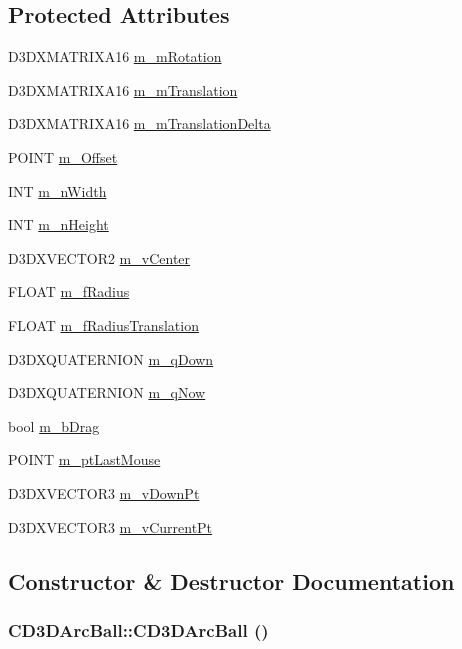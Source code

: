\subsection*{Protected Attributes}
\begin{DoxyCompactItemize}
\item 
D3DXMATRIXA16 \hyperlink{class_c_d3_d_arc_ball_a02619e72fe82db21a3c237a94eb31a37}{m\_\-mRotation}
\item 
D3DXMATRIXA16 \hyperlink{class_c_d3_d_arc_ball_a2d9f13c59ac72cec38ab704159b7e4e9}{m\_\-mTranslation}
\item 
D3DXMATRIXA16 \hyperlink{class_c_d3_d_arc_ball_ad630f2a7fc9ca7f77574ba9e9560c672}{m\_\-mTranslationDelta}
\item 
POINT \hyperlink{class_c_d3_d_arc_ball_ab6246cc5b63d98a3dfcb4530cae75ef4}{m\_\-Offset}
\item 
INT \hyperlink{class_c_d3_d_arc_ball_a71b658e5247eb150029dfe923bd116c3}{m\_\-nWidth}
\item 
INT \hyperlink{class_c_d3_d_arc_ball_a53bb3eeba4a817148421c5c53b4b846d}{m\_\-nHeight}
\item 
D3DXVECTOR2 \hyperlink{class_c_d3_d_arc_ball_a6075b159b5221b3091e32b090c0dcab3}{m\_\-vCenter}
\item 
FLOAT \hyperlink{class_c_d3_d_arc_ball_a11401fa5425ecaab3669745a4c20e552}{m\_\-fRadius}
\item 
FLOAT \hyperlink{class_c_d3_d_arc_ball_a4600c8ffe537118ba7b8f7fdc60c9322}{m\_\-fRadiusTranslation}
\item 
D3DXQUATERNION \hyperlink{class_c_d3_d_arc_ball_a944bbe7cbea8e5c715b1c62a0a6ba32f}{m\_\-qDown}
\item 
D3DXQUATERNION \hyperlink{class_c_d3_d_arc_ball_a248db3d61e41f65195810367bbe849f1}{m\_\-qNow}
\item 
bool \hyperlink{class_c_d3_d_arc_ball_a437b55976f4fe81a6f294a2d1f11ac81}{m\_\-bDrag}
\item 
POINT \hyperlink{class_c_d3_d_arc_ball_ae4114109f3ae6ae749748210b54405ad}{m\_\-ptLastMouse}
\item 
D3DXVECTOR3 \hyperlink{class_c_d3_d_arc_ball_a702ae593d9a99c473c33bc762b6034de}{m\_\-vDownPt}
\item 
D3DXVECTOR3 \hyperlink{class_c_d3_d_arc_ball_a759c768375a12e49cfdad6d141e60d21}{m\_\-vCurrentPt}
\end{DoxyCompactItemize}


\subsection{Constructor \& Destructor Documentation}
\hypertarget{class_c_d3_d_arc_ball_ae5b332fb9c87ddde4670c782b8299e40}{
\subsubsection[{CD3DArcBall}]{\setlength{\rightskip}{0pt plus 5cm}CD3DArcBall::CD3DArcBall ()}}
\label{class_c_d3_d_arc_ball_ae5b332fb9c87ddde4670c782b8299e40}


